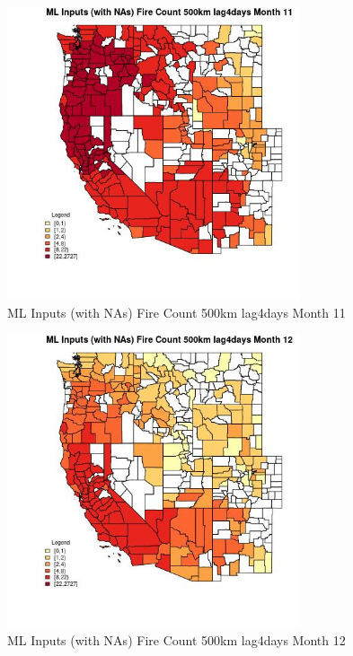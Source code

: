 \begin{figure} 
\centering  
\includegraphics[width=0.77\textwidth]{Code_Outputs/Report_ML_input_PM25_Step4_part_f_de_duplicated_aves_prioritize_24hr_obswNAs_CountyFire_Count_500km_lag4daysmedianMonth11.jpg} 
\caption{\label{fig:Report_ML_input_PM25_Step4_part_f_de_duplicated_aves_prioritize_24hr_obswNAsCountyFire_Count_500km_lag4daysmedianMonth11}ML Inputs (with NAs) Fire Count 500km lag4days Month 11} 
\end{figure} 
 

\begin{figure} 
\centering  
\includegraphics[width=0.77\textwidth]{Code_Outputs/Report_ML_input_PM25_Step4_part_f_de_duplicated_aves_prioritize_24hr_obswNAs_CountyFire_Count_500km_lag4daysmedianMonth12.jpg} 
\caption{\label{fig:Report_ML_input_PM25_Step4_part_f_de_duplicated_aves_prioritize_24hr_obswNAsCountyFire_Count_500km_lag4daysmedianMonth12}ML Inputs (with NAs) Fire Count 500km lag4days Month 12} 
\end{figure} 
 

